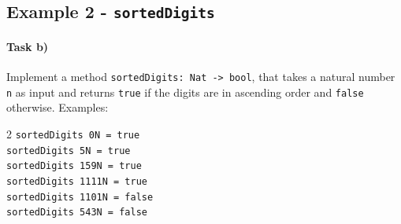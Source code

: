 \subsection{Example 2 - \texttt{sortedDigits}} %


\paragraph{Task b)} Implement a method \lstinline[basicstyle=\ttfamily]|sortedDigits: Nat -> bool|,
that takes a natural number \lstinline[basicstyle=\ttfamily]|n| as input and returns
\lstinline[basicstyle=\ttfamily]|true| if the digits are in ascending order and \lstinline[basicstyle=\ttfamily]|false| otherwise. Examples:
\begin{center}\begin{multicols}{2}
	\lstinline[basicstyle=\ttfamily]|sortedDigits 0N = true|\\
	\lstinline[basicstyle=\ttfamily]|sortedDigits 5N = true|\\
	\lstinline[basicstyle=\ttfamily]|sortedDigits 159N = true|\\
	\lstinline[basicstyle=\ttfamily]|sortedDigits 1111N = true|\\
	\lstinline[basicstyle=\ttfamily]|sortedDigits 1101N = false|\\
	\lstinline[basicstyle=\ttfamily]|sortedDigits 543N = false|
\end{multicols}\end{center}









